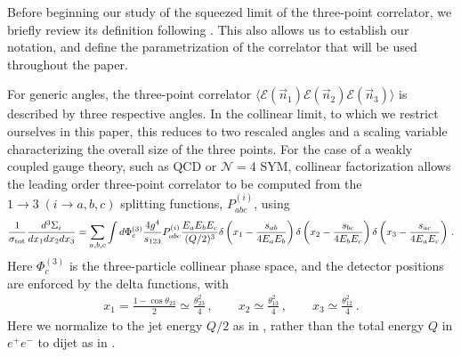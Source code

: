 \documentclass[letterpaper,11pt]{article}
\def\beq{\begin{equation}}
\def\eeq{\end{equation}}
\def\cN{\mathcal{N}}
\newcommand{\ang}[1]{\langle #1 \rangle}
\def\beq{\begin{equation}}
\def\eeq{\end{equation}}
\begin{document}
Before beginning our study of the squeezed limit of the three-point correlator, we briefly review its definition following \cite{Chen:2019bpb}. This also allows us to establish our notation, and define  the parametrization of the correlator that will be used throughout the paper. 


For generic angles, the three-point correlator $\ang{\mathcal{E}(\vec{n}_1)\mathcal{E}(\vec{n}_2)\mathcal{E}(\vec{n}_3)}$ is described by three respective angles. In the collinear limit, to which we restrict ourselves in this paper, this reduces to two rescaled angles and a scaling variable characterizing the overall size of the three points. For the case of a weakly coupled gauge theory, such as QCD or $\cN=4$ SYM, collinear factorization allows the leading order three-point correlator to be computed from the  $1\to 3\; (i\to a,b,c)$ splitting functions, $P_{a b c}^{(i)}$, using
\beq
\frac{1}{\sigma_{\rm tot}}\frac{d^3\Sigma_i}{d x_1 d x_2 d x_3}=\sum_{a,b,c} \int d\Phi_c^{(3)} \frac{4 g^4}{s_{123}} P_{a b c}^{(i)} \frac{E_a E_b E_c}{(Q/2)^3} \delta\left(x_1-\frac{s_{a b}}{4 E_a E_b}\right) \delta\left(x_2-\frac{s_{b c}}{4 E_b E_c}\right)\delta\left(x_3-\frac{s_{a c}}{4 E_a E_c}\right)\,.
\eeq
Here $\Phi_c^{(3)} $ is the three-particle collinear phase space, and the detector positions are enforced by the delta functions, with
\begin{align}
x_1 = \frac{1 - \cos \theta_{23}}{2} \simeq \frac{\theta_{23}^2}{4}\,,\qquad  x_2\simeq \frac{\theta_{13}^2}{4}\,, \qquad x_3\simeq\frac{\theta_{12}^2}{4}\,.
\end{align} 
Here we normalize to the jet energy $Q/2$ as in \cite{Chen:2020adz}, rather than the total energy $Q$ in $e^+e^-$ to dijet as in \cite{Chen:2019bpb}.
\end{document}

